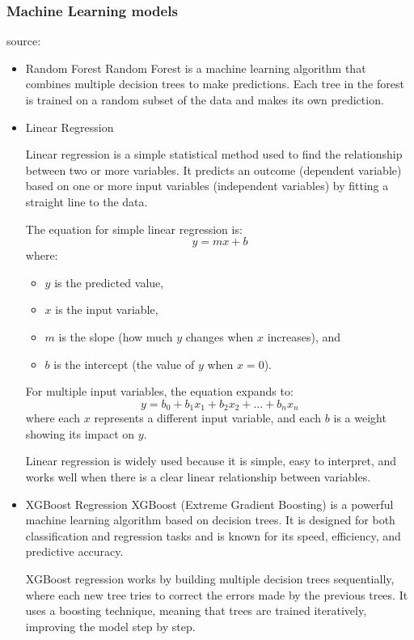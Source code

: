 \subsubsection{Machine Learning models}
source: \autocite{Handson}
\begin{itemize}
    \item Random Forest
    Random Forest is a machine learning algorithm that combines multiple decision trees to make predictions. Each tree in the forest is trained on a random subset of the data and makes its own prediction.
    \item Linear Regression

Linear regression is a simple statistical method used to find the relationship between two or more variables. It predicts an outcome (dependent variable) based on one or more input variables (independent variables) by fitting a straight line to the data.

The equation for simple linear regression is:  
\begin{equation}
    y = mx + b
\end{equation}
where:  
\begin{itemize}
    \item \( y \) is the predicted value,
    \item \( x \) is the input variable,
    \item \( m \) is the slope (how much \( y \) changes when \( x \) increases), and
    \item \( b \) is the intercept (the value of \( y \) when \( x = 0 \)).
\end{itemize}

For multiple input variables, the equation expands to:  
\begin{equation}
    y = b_0 + b_1x_1 + b_2x_2 + \dots + b_nx_n
\end{equation}
where each \( x \) represents a different input variable, and each \( b \) is a weight showing its impact on \( y \).

Linear regression is widely used because it is simple, easy to interpret, and works well when there is a clear linear relationship between variables.
    \item XGBoost Regression
    XGBoost (Extreme Gradient Boosting) is a powerful machine learning algorithm based on decision trees. It is designed for both classification and regression tasks and is known for its speed, efficiency, and predictive accuracy.

    XGBoost regression works by building multiple decision trees sequentially, where each new tree tries to correct the errors made by the previous trees. It uses a boosting technique, meaning that trees are trained iteratively, improving the model step by step.
    

\end{itemize}
